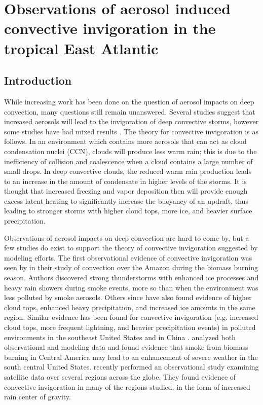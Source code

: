 \section{Observations of aerosol induced convective invigoration in the tropical East Atlantic}


\subsection{Introduction}
While increasing work has been done on the question of aerosol impacts on deep convection, many questions still remain unanswered.  Several studies \citep{Andreae:2004p32,Khain:2005p71,vandenHeever:2006p1147,vandenHeever:2007p53,Lee:2008p3014,Rosenfeld:2008p24,Lebo:2011p8933, rcepaper} suggest that increased aerosols will lead to the invigoration of deep convective storms, however some studies have had mixed results \citep[as summarized in][]{Khain:2009p18,taoreview}.  The theory for convective invigoration is as follows.  In an environment which contains more aerosols that can act as cloud condensation nuclei (CCN), clouds will produce less warm rain; this is due to the inefficiency of collision and coalescence when a cloud contains a large number of small drops.  In deep convective clouds, the reduced warm rain production leads to an increase in the amount of condensate in higher levels of the storms.  It is thought that increased freezing and vapor deposition then will provide enough excess latent heating to significantly increase the buoyancy of an updraft, thus leading to stronger storms with higher cloud tops, more ice, and heavier surface precipitation.

Observations of aerosol impacts on deep convection are hard to come by, but a few studies do exist to support the theory of convective invigoration suggested by modeling efforts.  The first observational evidence of convective invigoration was seen by \citet{Andreae:2004p32} in their study of convection over the Amazon during the biomass burning season.  Authors discovered strong thunderstorms with enhanced ice processes and heavy rain showers during smoke events, more so than when the environment was less polluted by smoke aerosols.  Others since \citep[e.g.][]{Lin:2006p54,TenHoeve:2012p8924} have also found evidence of higher cloud tops, enhanced heavy precipitation, and increased ice amounts in the same region.  Similar evidence has been found for convective invigoration (e.g. increased cloud tops, more frequent lightning, and heavier precipitation events) in polluted environments in the southeast United States \citep{Bell:2008p8489} and in China \citep{Wang:2011p8523}.  \citet{Wang:2009p8935} analyzed both observational and modeling data and found evidence that smoke from biomass burning in Central America may lead to an enhancement of severe weather in the south central United States.  \citet{Heiblum:2012p8926} recently performed an observational study examining satellite data over several regions across the globe.  They found evidence of convective invigoration in many of the regions studied, in the form of increased rain center of gravity.

